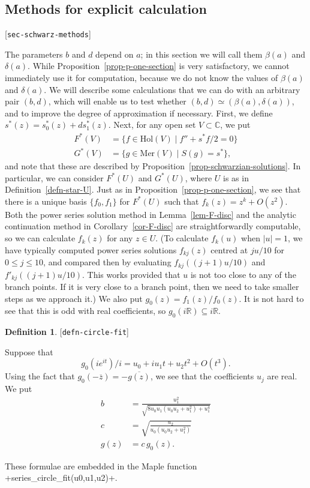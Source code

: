 \documentclass[reqno]{amsart}
\newcommand{\lbl}[1]{\label{#1}\textup{[\texttt{#1}]}\par}
\newcommand{\lbl}{\label}
\newcommand{\bt}        {\beta}
\newcommand{\dl}        {\delta}
\newcommand{\R}         {{\mathbb{R}}}
\newcommand{\C}         {{\mathbb{C}}}
\newcommand{\ov}[1]     {\overline{#1}}
\newcommand{\st}        {\;|\;}
\newcommand{\sse}       {\subseteq}
\renewcommand{\:}{\colon}
\theoremstyle{definition}
\newtheorem{definition}[theorem]{Definition}
\begin{document}
\subsection{Methods for explicit calculation}
\lbl{sec-schwarz-methods}

The parameters $b$ and $d$ depend on $a$; in this section we will call
them $\bt(a)$ and $\dl(a)$.  While
Proposition~\ref{prop-p-one-section} is very satisfactory, we cannot
immediately use it for computation, because we do not know the
values of $\bt(a)$ and $\dl(a)$.  We will describe some calculations
that we can do with an arbitrary pair $(b,d)$, which will enable us to
test whether $(b,d)\simeq(\bt(a),\dl(a))$, and to improve the degree
of approximation if necessary.  First, we define
$s^*(z)=s_0^*(z)+ds_1^*(z)$.  Next, for any open set $V\subset\C$, we
put
\begin{align*}
 F^*(V) &= \{f\in\text{Hol}(V)\st f''+s^*f/2=0\} \\
 G^*(V) &= \{g\in\text{Mer}(V)\st S(g)=s^*\},
\end{align*}
and note that these are described by
Proposition~\ref{prop-schwarzian-solutions}.  In particular, we can
consider $F^*(U)$ and $G^*(U)$, where $U$ is as in
Definition~\ref{defn-star-U}.  Just as in
Proposition~\ref{prop-p-one-section}, we see that there is a unique
basis $\{f_0,f_1\}$ for $F^*(U)$ such that $f_k(z)=z^k+O(z^2)$.  Both
the power series solution method in Lemma~\ref{lem-F-disc} and the
analytic continuation method in Corollary~\ref{cor-F-disc} are
straightforwardly computable, so we can calculate $f_k(z)$ for any
$z\in U$.  (To calculate $f_k(u)$ when $|u|=1$, we have typically
computed power series solutions $f_{kj}(z)$ centred at $ju/10$ for
$0\leq j\leq 10$, and compared then by evaluating $f_{kj}((j+1)u/10)$
and $f'_{kj}((j+1)u/10)$.  This works provided that $u$ is not too
close to any of the branch points.  If it is very close to a branch
point, then we need to take smaller steps as we approach it.)  We also
put $g_0(z)=f_1(z)/f_0(z)$.  It is not hard to see that this is odd
with real coefficients, so $g_0(i\R)\sse i\R$.

\begin{definition}\lbl{defn-circle-fit}
 Suppose that
 \[ g_0(ie^{it})/i = u_0+iu_1t+u_2t^2+O(t^3). \]
 Using the fact that $g_0(-\ov{z})=-\ov{g(z)}$, we see that the
 coefficients $u_j$ are real.  We put
 \begin{align*}
  b &= \frac{u_1^2}{\sqrt{8u_0u_1(u_0u_2+u_1^2)+u_1^4}} \\
  c &= \sqrt{\frac{u_2}{u_0(u_0u_2+u_1^2)}} \\
  g(z) &= c\,g_0(z).
 \end{align*}
\end{definition}
These formulae are embedded in the Maple function
\mcode+series_circle_fit(u0,u1,u2)+.
\end{document}

